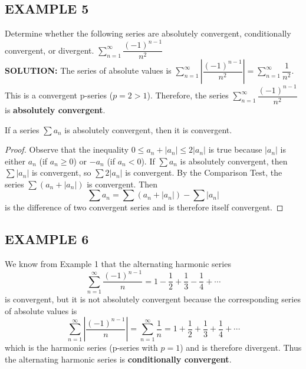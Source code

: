 \documentclass{article}
\theoremstyle{mystyle}
\begin{document}
\subsection*{EXAMPLE 5}
Determine whether the following series are absolutely convergent, conditionally convergent, or divergent.
\( \sum_{n=1}^{\infty} \dfrac{(-1)^{n-1}}{n^2} \) \quad \\
\textbf{SOLUTION:}
The series of absolute values is \( \sum_{n=1}^{\infty} \left| \dfrac{(-1)^{n-1}}{n^2} \right| = \sum_{n=1}^{\infty} \dfrac{1}{n^2} \). This is a convergent p-series (\(p=2 > 1\)). Therefore, the series \( \sum_{n=1}^{\infty} \dfrac{(-1)^{n-1}}{n^2} \) is \textbf{absolutely convergent}.
  
\begin{tcolorbox}[
    colback=white,
    colframe=orange!80!white,
    title=Theorem,
    boxrule=0.5mm,
    arc=3mm
    ]
    If a series \( \sum a_n \) is absolutely convergent, then it is convergent.
\end{tcolorbox}

\begin{proof}
[Proof]
Observe that the inequality \( 0 \le a_n + |a_n| \le 2|a_n| \) is true because \(|a_n|\) is either \(a_n\) (if \(a_n \ge 0\)) or \(-a_n\) (if \(a_n < 0\)).
If \( \sum a_n \) is absolutely convergent, then \( \sum |a_n| \) is convergent, so \( \sum 2|a_n| \) is convergent. By the Comparison Test, the series \( \sum (a_n + |a_n|) \) is convergent. Then
\[ \sum a_n = \sum (a_n + |a_n|) - \sum |a_n| \]
is the difference of two convergent series and is therefore itself convergent.
\end{proof}

\subsection*{EXAMPLE 6}
We know from Example 1 that the alternating harmonic series
\[ \sum_{n=1}^{\infty} \dfrac{(-1)^{n-1}}{n} = 1 - \dfrac{1}{2} + \dfrac{1}{3} - \dfrac{1}{4} + \cdots \]
is convergent, but it is not absolutely convergent because the corresponding series of absolute values is
\[ \sum_{n=1}^{\infty} \left| \dfrac{(-1)^{n-1}}{n} \right| = \sum_{n=1}^{\infty} \dfrac{1}{n} = 1 + \dfrac{1}{2} + \dfrac{1}{3} + \dfrac{1}{4} + \cdots \]
which is the harmonic series (p-series with \(p=1\)) and is therefore divergent. Thus the alternating harmonic series is \textbf{conditionally convergent}.
\end{document}
